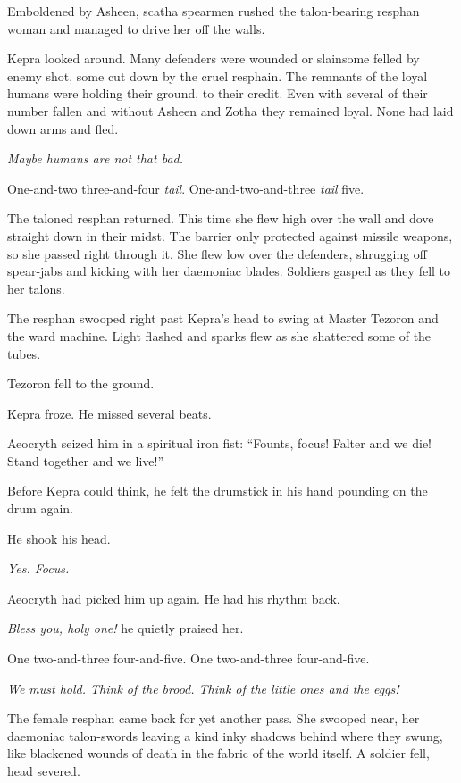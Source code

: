 \documentclass
  [a4paper,
   12pt,
   oneside
  ]%
  {article}
\newcommand{\drum}[1]{\textsf{#1}}
\begin{document}
Emboldened by Asheen, scatha spearmen rushed the talon-bearing resphan woman and managed to drive her off the walls. 

Kepra looked around. Many defenders were wounded or slain\dash{}some felled by enemy shot, some cut down by the cruel resphain. 
The remnants of the loyal humans were holding their ground, to their credit. 
Even with several of their number fallen and without Asheen and Zotha they remained loyal. None had laid down arms and fled. 

\emph{Maybe humans are not that bad.}

\drum{One-and-two three-and-four \emph{tail}. One-and-two-and-three \emph{tail} five.}

The taloned resphan returned. This time she flew high over the wall and dove straight down in their midst. 
The barrier only protected against missile weapons, so she passed right through it. 
She flew low over the defenders, shrugging off spear-jabs and kicking with her daemoniac blades. 
Soldiers gasped as they fell to her talons.

The resphan swooped right past Kepra’s head to swing at Master Tezoron and the ward machine. 
Light flashed and sparks flew as she shattered some of the tubes. 

Tezoron fell to the ground. 

Kepra froze. He missed several beats. 

Aeocryth seized him in a spiritual iron fist: 
``Founts, focus! Falter and we die! Stand together and we live!'' 

Before Kepra could think, he felt the drumstick in his hand pounding on the drum again. 

He shook his head. 

\emph{Yes. Focus.} 

Aeocryth had picked him up again. He had his rhythm back. 

\emph{Bless you, holy one!} he quietly praised her.

\drum{One two-and-three four-and-five. One two-and-three four-and-five.}

\emph{We must hold. Think of the brood. Think of the little ones and the eggs!}

The female resphan came back for yet another pass. She swooped near, her daemoniac talon-swords leaving a kind inky shadows behind where they swung, like blackened wounds of death in the fabric of the world itself. 
A soldier fell, head severed. 
\end{document}
